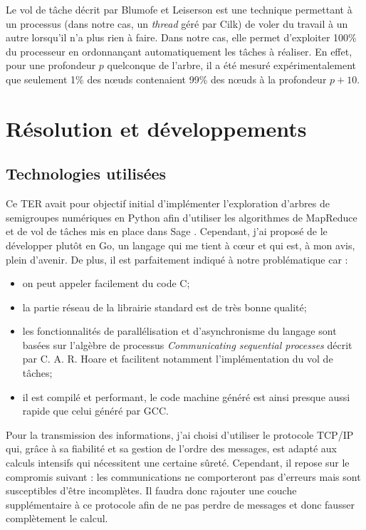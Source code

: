 \documentclass[12pt,a4paper]{report}
\begin{document}
Le vol de tâche décrit par Blumofe et Leiserson \cite{work-stealing} est une technique permettant à un processus (dans notre cas, un \emph{thread} géré par Cilk) de voler du travail à un autre lorsqu'il n'a plus rien à faire. Dans notre cas, elle permet d'exploiter 100\% du processeur en ordonnançant automatiquement les tâches à réaliser. En effet, pour une profondeur $p$ quelconque de l'arbre, il a été mesuré expérimentalement que seulement 1\% des n\oe{}uds contenaient 99\% des n\oe{}uds à la profondeur $p + 10$.

\chapter{Résolution et développements}

\section{Technologies utilisées}
Ce TER avait pour objectif initial d'implémenter l'exploration d'arbres de semigroupes numériques en Python afin d'utiliser les algorithmes de MapReduce et de vol de tâches mis en place dans Sage \cite{fh-hpc}. Cependant, j'ai proposé de le développer plutôt en Go, un langage qui me tient à c\oe{}ur et qui est, à mon avis, plein d'avenir. De plus, il est parfaitement indiqué à notre problématique car :
\begin{itemize}
	\item on peut appeler facilement du code C;
	\item la partie réseau de la librairie standard est de très bonne qualité;
	\item les fonctionnalités de parallélisation et d'asynchronisme du langage sont basées sur l'algèbre de processus \emph{Communicating sequential processes} décrit par C. A. R. Hoare \cite{csp} et facilitent notamment l'implémentation du vol de tâches;
	\item il est compilé et performant, le code machine généré est ainsi presque aussi rapide que celui généré par GCC.
\end{itemize}

Pour la transmission des informations, j'ai choisi d'utiliser le protocole TCP/IP qui, grâce à sa fiabilité et sa gestion de l'ordre des messages, est adapté aux calculs intensifs qui nécessitent une certaine sûreté. Cependant, il repose sur le compromis suivant : les communications ne comporteront pas d'erreurs mais sont susceptibles d'être incomplètes. Il faudra donc rajouter une couche supplémentaire à ce protocole afin de ne pas perdre de messages et donc fausser complètement le calcul.
\end{document}

